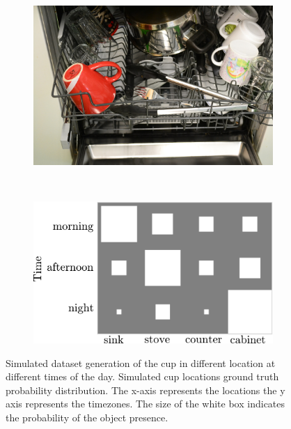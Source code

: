 \begin{figure}
    \centering
    \begin{subfigure}[b]{0.4\textwidth}
        \includegraphics[width=\textwidth]{images/cup_dishwasher.jpg}
        \caption{}
        \label{fig:eval_cup}
    \end{subfigure}
    ~ %
    \begin{subfigure}[b]{0.5\textwidth}
        \includegraphics[width=\textwidth]{images/eval_ground_truth.png}
        \caption{}
        \label{fig:eval_gt}
    \end{subfigure}
    \caption[Model Validation dataset generation]{Simulated dataset generation of the cup in different location at different times of the day. Simulated cup locations ground truth probability distribution.
The x-axis represents the locations the y axis represents the timezones. The size of the white box indicates the probability of the object presence.}
\label{}
\end{figure}




